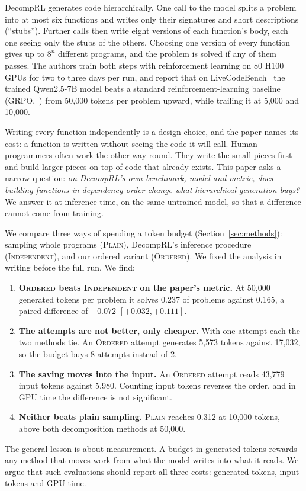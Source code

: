 \documentclass[11pt]{article}
\newcommand{\plain}{\textsc{Plain}}
\newcommand{\indep}{\textsc{Independent}}
\newcommand{\ordered}{\textsc{Ordered}}
\begin{document}
DecompRL generates code hierarchically. One call to the model splits a problem into at most six functions and writes
only their signatures and short descriptions (``stubs''). Further calls then write eight versions of each function's
body, each one seeing only the stubs of the others. Choosing one version of every function gives up to $8^n$ different
programs, and the problem is solved if any of them passes. The authors train both steps with reinforcement learning
on 80 H100 GPUs for two to three days per run, and report that on LiveCodeBench~\citep{jain2024livecodebench}
the trained Qwen2.5-7B model beats a standard reinforcement-learning baseline (GRPO,~\citep{shao2024deepseekmath})
from 50,000 tokens per problem upward, while trailing it at 5,000 and 10,000.

Writing every function independently is a design choice, and the paper names its cost: a function is written without
seeing the code it will call. Human programmers often work the other way round. They write the small pieces first
and build larger pieces on top of code that already exists. This paper asks a narrow question: \emph{on DecompRL's
own benchmark, model and metric, does building functions in dependency order change what hierarchical generation
buys?} We answer it at inference time, on the same untrained model, so that a difference cannot come from training.

We compare three ways of spending a token budget (Section~\ref{sec:methods}): sampling whole programs (\plain),
DecompRL's inference procedure (\indep), and our ordered variant (\ordered). We fixed the analysis in writing before
the full run. We find:
\begin{enumerate}[label=(\arabic*)]
  \item \textbf{\ordered{} beats \indep{} on the paper's metric.} At 50,000 generated tokens per problem it solves
        0.237 of problems against 0.165, a paired difference of $+0.072$ $[+0.032, +0.111]$.
  \item \textbf{The attempts are not better, only cheaper.} With one attempt each the two methods tie. An \ordered{}
        attempt generates 5,573 tokens against 17,032, so the budget buys 8 attempts instead of 2.
  \item \textbf{The saving moves into the input.} An \ordered{} attempt reads 43,779 input tokens against 5,980.
        Counting input tokens reverses the order, and in GPU time the difference is not significant.
  \item \textbf{Neither beats plain sampling.} \plain{} reaches 0.312 at 10,000 tokens, above both decomposition
        methods at 50,000.
\end{enumerate}
The general lesson is about measurement. A budget in generated tokens rewards any method that moves work from what
the model writes into what it reads. We argue that such evaluations should report all three costs: generated tokens,
input tokens and GPU time.
\end{document}
